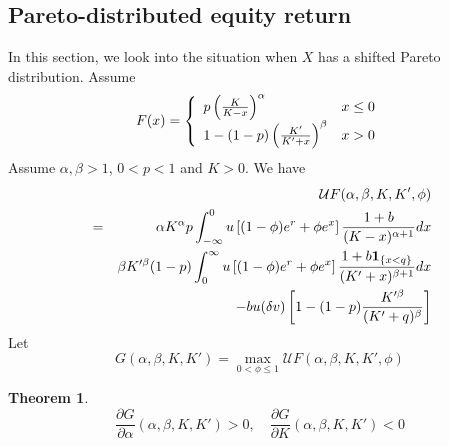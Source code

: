 \documentclass{article}
\newcommand{\pd}[2]{
  \frac{\partial #1}{\partial #2}
}
\newcommand{\1}[1]{
  \mathbf{1}_{\{#1\}}
}
\newtheorem{theorem}{Theorem}
\begin{document}
\subsection{Pareto-distributed equity return}
In this section, we look into the situation when $X$ has a shifted
Pareto distribution. Assume
\begin{equation}
  \label{eq:X_distr}
  F(x) = \left\{
  \begin{array}{ll}
    p \left(
    {K \over K - x}
    \right)^\alpha & x \leq 0 \\
    1 - (1 - p) \left(
    {K' \over K' + x}
    \right)^\beta & x > 0
  \end{array}
  \right.
\end{equation}
Assume $\alpha, \beta > 1$, $0 < p < 1$ and $K > 0$.
We have
\begin{eqnarray}
  && \mathcal U F (\alpha, \beta, K, K', \phi) \nonumber \\
  &=&
  \alpha K^\alpha  p
  \int_{-\infty}^0
  u\left[ (1 - \phi) e^r + \phi e^x \right]
  {1 + b \over (K - x)^{\alpha + 1}} dx
  \nonumber \\
  &&
  \beta K'^\beta (1 - p)
  \int_{0}^\infty
  u\left[ (1 - \phi) e^r + \phi e^x \right]
  {1 + b \1{x < q} \over (K' + x)^{\beta + 1}} dx \nonumber \\
  &&
  - b u(\delta v) \left[
    1 - (1 - p) {
      K'^\beta
      \over
      (K' + q)^\beta
    }
  \right]
  \label{eq:xxie1.0}
\end{eqnarray}
Let
\[
G(\alpha, \beta, K, K') =
\max_{0 < \phi \leq 1} \mathcal U F(\alpha, \beta, K, K', \phi)
\]
\begin{theorem}
  \label{thrm:I}
  \[
  \pd{G}{\alpha} (\alpha, \beta, K, K') > 0,
  \quad
  \pd{G}{K} (\alpha, \beta, K, K') < 0
  \]
\end{theorem}
\end{document}
